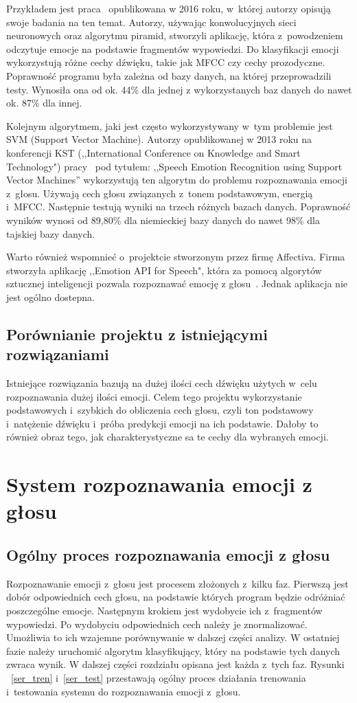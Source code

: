 \documentclass[declaration,shortabstract]{iithesis}
\begin{document}
Przykładem jest praca~\cite{sernn} opublikowana w 2016 roku, w~której autorzy opisują swoje badania na ten temat. Autorzy, używając konwolucyjnych sieci neuronowych oraz algorytmu piramid, stworzyli aplikację, która z~powodzeniem odczytuje emocje na podstawie fragmentów wypowiedzi. Do klasyfikacji emocji wykorzystują różne cechy dźwięku, takie jak MFCC czy cechy prozodyczne. Poprawność programu była zależna od bazy danych, na której przeprowadzili testy. Wynosiła ona od ok. 44\% dla jednej z wykorzystanych baz danych do nawet ok. 87\% dla innej.

Kolejnym algorytmem, jaki jest często wykorzystywany w~tym problemie jest SVM (Support Vector Machine). Autorzy opublikowanej w 2013 roku na konferencji KST (,,International Conference on Knowledge and Smart Technology") pracy~\cite{svn} pod tytułem: ,,Speech Emotion Recognition using Support Vector Machines” wykorzystują ten algorytm do problemu rozpoznawania emocji z~głosu. Używają cech głosu związanych z~tonem podstawowym, energią i~MFCC. Następnie testują wyniki na trzech różnych bazach danych. Poprawność wyników wynosi od 89,80\% dla niemieckiej bazy danych do nawet 98\% dla tajskiej bazy danych.

Warto również wspomnieć o~projektcie stworzonym przez firmę Affectiva. Firma stworzyła aplikację ,,Emotion API for Speech", która za pomocą algorytów sztucznej inteligencji pozwala rozpoznawać emocję z głosu~\cite{emo_api_speech}. Jednak aplikacja nie jest ogólno dostepna.

\section{Porównianie projektu z istniejącymi rozwiązaniami}
Istniejące rozwiązania bazują na dużej ilości cech dźwięku użytych w~celu rozpoznawania dużej ilości emocji.
Celem tego projektu wykorzystanie podstawowych i~szybkich do obliczenia cech głosu, czyli ton podstawowy i~natężenie dźwięku i~próba predykcji emocji na ich podstawie. Dałoby to również obraz tego, jak charakterystyczne sa te cechy dla wybranych emocji.

\let\cleardoublepage\clearpage
\chapter{System rozpoznawania emocji z głosu}
\section{Ogólny proces rozpoznawania emocji z głosu}
Rozpoznawanie emocji z~głosu jest procesem złożonych z~kilku faz.
Pierwszą jest dobór odpowiednich cech głosu, na podstawie których program będzie odróżniać poszczególne emocje. Następnym krokiem jest wydobycie ich z~fragmentów wypowiedzi. Po wydobyciu odpowiednich cech należy je znormalizować. Umożliwia to ich wzajemne porównywanie w dalszej części analizy. W ostatniej fazie należy uruchomić algorytm klasyfikujący, który na podstawie tych danych zwraca wynik.
W dalszej części rozdziału opisana jest każda z~tych faz. Rysunki ~\ref{ser_tren} i~\ref{ser_test} przestawają ogólny proces działania trenowania i~testowania systemu do rozpoznawania emocji z~głosu.
\end{document}
